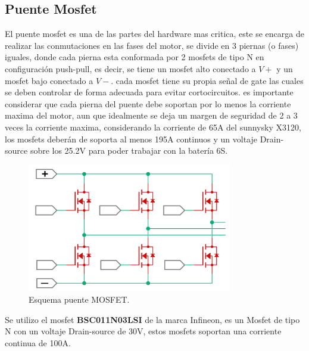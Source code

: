 \documentclass[11pt]{report}
\begin{document}
\newpage
\subsection{Puente Mosfet}

El puente mosfet es una de las partes del hardware mas critica, este se encarga de realizar las conmutaciones en las fases del motor, se divide en 3 piernas (o fases) iguales, donde cada pierna esta conformada por 2 mosfets de tipo N en configuración push-pull, es decir, se tiene un mosfet alto conectado a $V+$ y un mosfet bajo conectado a $V-$. cada mosfet tiene su propia señal de gate las cuales se deben controlar de forma adecuada para evitar cortocircuitos. es importante considerar que cada pierna del puente debe soportan por lo menos la corriente maxima del motor, aun que idealmente se deja un margen de seguridad de 2 a 3 veces la corriente maxima, considerando la corriente de 65A del sunnysky X3120, los mosfets deberán de soporta al menos 195A continuos y un voltaje Drain-source sobre los 25.2V para poder trabajar con la batería 6S.

\begin{figure}[ht]
	\centering
	\includegraphics[width=0.8\textwidth]{imagenes/Diagramas/puente mosfet.png}
	\caption{Esquema puente MOSFET.}
	\label{puente_MOSFET}
\end{figure}
\FloatBarrier

Se utilizo el mosfet \textbf{BSC011N03LSI} de la marca Infineon, es un Mosfet de tipo N con un voltaje Drain-source de 30V, estos mosfets soportan una corriente continua de 100A.
\end{document}
